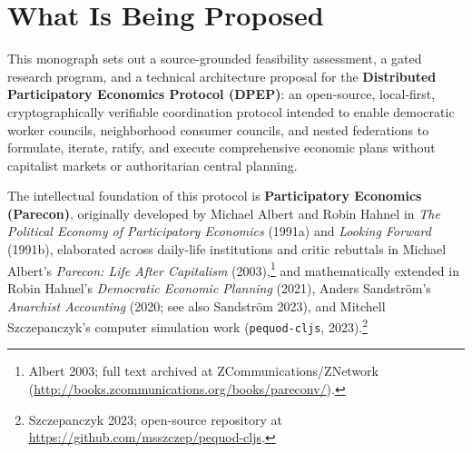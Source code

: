 \documentclass[10pt,twoside,openany]{book}
\theoremstyle{dpepstyle}
\begin{document}
\section{What Is Being Proposed}

This monograph sets out a source-grounded feasibility assessment, a gated research program, and a technical architecture proposal for the \textbf{Distributed Participatory Economics Protocol (DPEP)}: an open-source, local-first, cryptographically verifiable coordination protocol intended to enable democratic worker councils, neighborhood consumer councils, and nested federations to formulate, iterate, ratify, and execute comprehensive economic plans without capitalist markets or authoritarian central planning.

The intellectual foundation of this protocol is \textbf{Participatory Economics (Parecon)}, originally developed by Michael Albert and Robin Hahnel in \emph{The Political Economy of Participatory Economics} (1991a) and \emph{Looking Forward} (1991b), elaborated across daily-life institutions and critic rebuttals in Michael Albert's \emph{Parecon: Life After Capitalism} (2003),\footnote{Albert 2003; full text archived at ZCommunications/ZNetwork (\url{http://books.zcommunications.org/books/pareconv/}).} and mathematically extended in Robin Hahnel's \emph{Democratic Economic Planning} (2021), Anders Sandstr\"om's \emph{Anarchist Accounting} (2020; see also Sandstr\"om 2023), and Mitchell Szczepanczyk's computer simulation work (\texttt{pequod-cljs}, 2023).\footnote{Szczepanczyk 2023; open-source repository at \url{https://github.com/msszczep/pequod-cljs}.}
\end{document}
